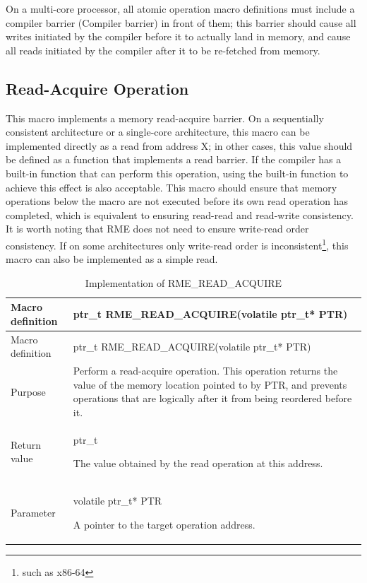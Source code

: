 On a multi-core processor, all atomic operation macro definitions must include a compiler barrier (Compiler
barrier) in front of them; this barrier should cause all writes initiated by the compiler before it to actually land in memory, and cause all reads initiated by the compiler after it to be re-fetched from memory.

\subsection{Read-Acquire Operation}\label{subsec:7-read-acquire-operation}

This macro implements a memory read-acquire barrier. On a sequentially consistent architecture or a single-core architecture, this macro can be implemented directly as a read from address X; in other cases, this value should be defined as a function that implements a read barrier. If the compiler has a built-in function that can perform this operation, using the built-in function to achieve this effect is also acceptable. This macro should ensure that memory operations below the macro are not executed before its own read operation has completed, which is equivalent to ensuring read-read and read-write consistency. It is worth noting that RME does not need to ensure write-read order consistency. If on some architectures only write-read order is inconsistent\footnote{such as x86-64}, this macro can also be implemented as a simple read.

\begin{xltabular}{\textwidth}{@{}>{\hsize\raggedright\arraybackslash}X>{\hsize\raggedright\arraybackslash}X@{}}
\caption{Implementation of RME\_READ\_ACQUIRE}\label{tab:7-29-rme-read-acquire-implementation}\\
\toprule
Macro definition & ptr\_t RME\_READ\_ACQUIRE(volatile ptr\_t* PTR)\tabularnewline
\endfirsthead
\toprule
Macro definition & ptr\_t RME\_READ\_ACQUIRE(volatile ptr\_t* PTR)\tabularnewline
\midrule
\endhead
\bottomrule
\endlastfoot
Purpose &
Perform a read-acquire operation. This operation returns the value of the memory location pointed to by PTR, and prevents operations that are logically after it from being reordered before it.\tabularnewline
Return value\strut
 & ptr\_t

The value obtained by the read operation at this address.\strut
\tabularnewline
Parameter\strut
 & volatile ptr\_t* PTR

A pointer to the target operation address.\strut
\tabularnewline
\end{xltabular}
\nopagebreak[4]

